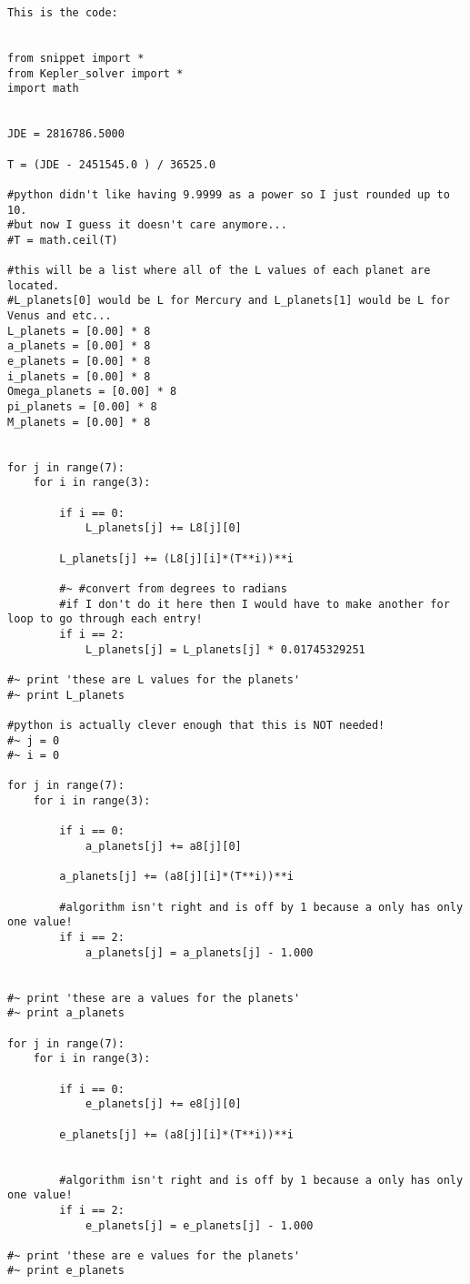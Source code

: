 \documentclass[12pt, leqno]{article}
\begin{document}
\begin{lstlisting}
This is the code: 


from snippet import * 
from Kepler_solver import * 
import math


JDE = 2816786.5000

T = (JDE - 2451545.0 ) / 36525.0

#python didn't like having 9.9999 as a power so I just rounded up to 10.
#but now I guess it doesn't care anymore...  
#T = math.ceil(T)  

#this will be a list where all of the L values of each planet are located. 
#L_planets[0] would be L for Mercury and L_planets[1] would be L for Venus and etc... 
L_planets = [0.00] * 8 
a_planets = [0.00] * 8 
e_planets = [0.00] * 8 
i_planets = [0.00] * 8 
Omega_planets = [0.00] * 8 
pi_planets = [0.00] * 8 
M_planets = [0.00] * 8 


for j in range(7): 
	for i in range(3): 
		
		if i == 0: 
			L_planets[j] += L8[j][0]
			
		L_planets[j] += (L8[j][i]*(T**i))**i
		
		#~ #convert from degrees to radians 
		#if I don't do it here then I would have to make another for loop to go through each entry! 
		if i == 2: 
			L_planets[j] = L_planets[j] * 0.01745329251

#~ print 'these are L values for the planets' 
#~ print L_planets

#python is actually clever enough that this is NOT needed! 
#~ j = 0 
#~ i = 0

for j in range(7): 
	for i in range(3): 
		
		if i == 0: 
			a_planets[j] += a8[j][0]
			
		a_planets[j] += (a8[j][i]*(T**i))**i
		
		#algorithm isn't right and is off by 1 because a only has only one value!  
		if i == 2: 
			a_planets[j] = a_planets[j] - 1.000
	

#~ print 'these are a values for the planets' 
#~ print a_planets

for j in range(7): 
	for i in range(3): 
		
		if i == 0: 
			e_planets[j] += e8[j][0]
			
		e_planets[j] += (a8[j][i]*(T**i))**i
		
		
		#algorithm isn't right and is off by 1 because a only has only one value!  
		if i == 2: 
			e_planets[j] = e_planets[j] - 1.000

#~ print 'these are e values for the planets'
#~ print e_planets


\end{lstlisting}
\end{document}
